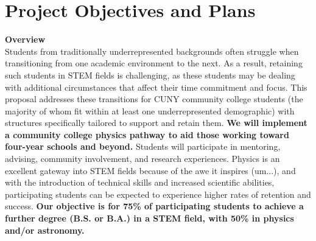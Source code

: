 \documentclass[12pt]{article}
\begin{document}
\section{Project Objectives and Plans}

\noindent
{\bf Overview}\\
Students from traditionally underrepresented backgrounds often struggle when transitioning from one academic environment to the next.  %
As a result, retaining such students in STEM fields is challenging, as these students may be 
dealing with additional circumstances that affect their time commitment and focus.  This proposal addresses these transitions for CUNY community college students (the majority of whom fit within at least one underrepresented demographic) with structures specifically tailored to support and retain them.
 {\bf We will implement a community college physics pathway to aid those working toward four-year schools and beyond.}  Students will participate in mentoring, advising, community involvement, and research experiences.  Physics is an excellent gateway into STEM fields because of the awe it inspires (um...), and with the introduction of technical skills and increased scientific abilities, participating students can be expected to experience higher rates of retention and success.  {\bf Our objective is for  75\% of participating students to achieve a further degree (B.S. or B.A.) in a STEM field, with 50\%  in physics and/or  astronomy.} %
\end{document}
